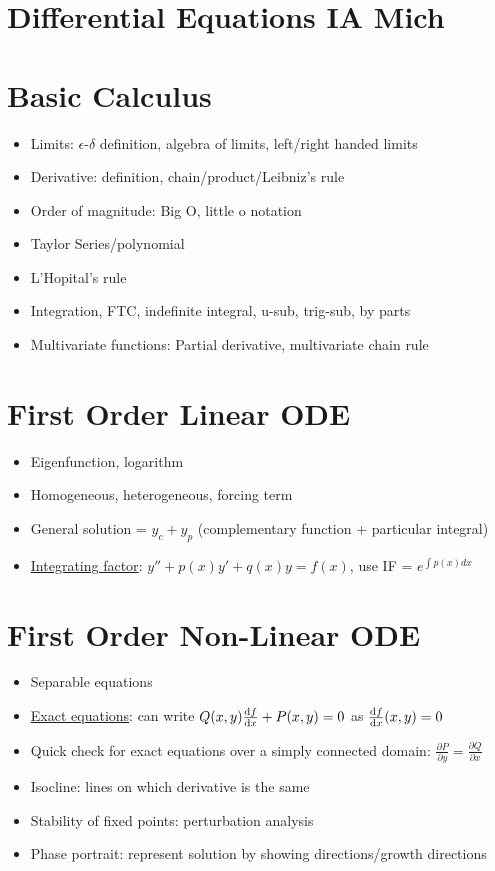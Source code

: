 



\section*{Differential Equations \hfill IA Mich}
\section{Basic Calculus}
\begin{itemize}
      \item Limits: $\epsilon$-$\delta$ definition,
            algebra of limits, left/right handed limits
      \item Derivative: definition, chain/product/Leibniz's rule
      \item Order of magnitude: Big O, little o notation
      \item Taylor Series/polynomial
      \item L'Hopital's rule
      \item Integration, FTC, indefinite integral, u-sub, trig-sub, by parts
      \item Multivariate functions: Partial derivative, multivariate chain rule
\end{itemize}

\section{First Order Linear ODE}
\begin{itemize}
      \item Eigenfunction, logarithm
      \item Homogeneous, heterogeneous, forcing term
      \item General solution = $y_c + y_p$ (complementary function + particular integral)
      \item \underline{Integrating factor}: $y'' + p(x)y' + q(x)y=f(x)$, use IF = $e^{\int{p(x)dx}}$
\end{itemize}

\section{First Order Non-Linear ODE}
\begin{itemize}
      \item Separable equations
      \item \underline{Exact equations}: can write $Q(x,y)\frac{\mathrm{d}{f}}{\mathrm{d}{x}} + P(x,y) =0$ as $\frac{\mathrm{d}{f}}{\mathrm{d}{x}}(x,y)=0$
      \item Quick check for exact equations over a simply connected domain: $\frac{\partial P}{\partial y} = \frac{\partial Q}{\partial x}$
      \item Isocline: lines on which derivative is the same
      \item Stability of fixed points: perturbation analysis
      \item Phase portrait: represent solution by showing directions/growth directions
\end{itemize}

